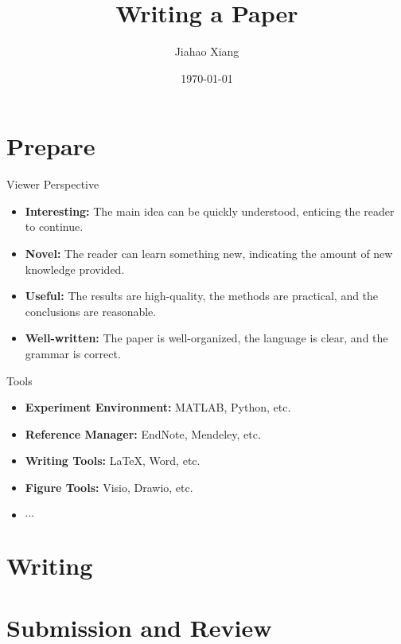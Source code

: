 \documentclass{beamer}
\title{Writing a Paper}
\author[xjh]{Jiahao Xiang\inst{1}}
\institute{
    \inst{1}
    Hengyang Normal University
}
\date{\today}
\begin{document}
\begin{frame}
    \titlepage
\end{frame}


\section{Prepare}
\begin{frame}{Viewer Perspective}
    \begin{itemize}
        \item \textbf{Interesting:} The main idea can be quickly understood, enticing the reader to continue.
        \item \textbf{Novel:} The reader can learn something new, indicating the amount of new knowledge provided.
        \item \textbf{Useful:} The results are high-quality, the methods are practical, and the conclusions are reasonable.
        \item \textbf{Well-written:} The paper is well-organized, the language is clear, and the grammar is correct.
    \end{itemize}
\end{frame}

\begin{frame}{Tools}
    \begin{itemize}
        \item \textbf{Experiment Environment:} MATLAB, Python, etc. 
        \item \textbf{Reference Manager:} EndNote, Mendeley, etc.
        \item \textbf{Writing Tools:} \LaTeX, Word, etc.
        \item \textbf{Figure Tools:} Visio, Drawio, etc.
        \item $\cdots$
    \end{itemize}
\end{frame}

\section{Writing}

\section{Submission and Review}
\end{document}
